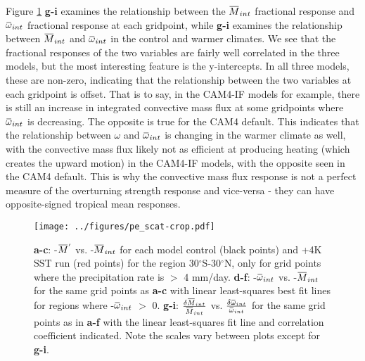 \documentclass[letterpaper,12pt,titlepage,oneside,final]{book}
\newcommand{\overbar}[1]{\mkern 1.5mu\overline{\mkern-1.5mu#1\mkern-1.5mu}\mkern 1.5mu}
\begin{document}
Figure \ref{fig:pe} \textbf{g-i} examines the relationship between the $\overbar{M}_{int}$ fractional response and $\overbar{\omega}_{int}$ fractional response at each gridpoint, while \textbf{g-i} examines the relationship between $\overbar{M}_{int}$ and $\overbar{\omega}_{int}$ in the control and warmer climates. We see that the fractional responses of the two variables are fairly well correlated in the three models, but the most interesting feature is the y-intercepts. In all three models, these are non-zero, indicating that the relationship between the two variables at each gridpoint is offset. That is to say, in the CAM4-IF models for example, there is still an increase in integrated convective mass flux at some gridpoints where $\overbar{\omega}_{int}$ is decreasing. The opposite is true for the CAM4 default. This indicates that the relationship between $\omega$ and 
$\overbar{\omega}_{int}$ is changing in the warmer climate as well, with the convective mass flux likely not as efficient at producing heating (which creates the upward motion) in the CAM4-IF models, with the opposite seen in the CAM4 default. This is why the convective mass flux response is not a perfect measure of the overturning strength response and vice-versa - they can have opposite-signed tropical mean responses.


\begin{figure}[H]
\centering
\noindent\texttt{[image: ../figures/pe\_scat-crop.pdf]}\hfill
\caption{\footnotesize \footnotesize \textbf{a-c}: -$\overbar{M}^{'}$ vs. -$\overbar{M}_{int}$ for each model control (black points) and +4K SST run (red points) for the region 30$^\circ$S-30$^\circ$N, only for grid points where the precipitation rate is $>$ 4 mm/day. \textbf{d-f}: -$\overbar{\omega}_{int}$ vs. -$\overbar{M}_{int}$ for the same grid points as \textbf{a-c} with linear least-squares best fit lines for regions where -$\overbar{\omega}_{int}$ $>$ 0. \textbf{g-i}: $\frac{\delta{\overbar{M}_{int}}}{\overbar{M}_{int}}$ vs. $\frac{\delta{\overbar{\omega}_{int}}}{\overbar{\omega}_{int}}$ for the same grid points as in \textbf{a-f} with the linear least-squares fit line and correlation coefficient indicated. Note the scales vary between plots except for \textbf{g-i}.}
\label{fig:pe}
\end{figure}
\end{document}
